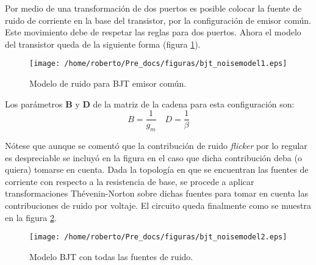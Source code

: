 \documentclass[letterpaper,10pt,twocolumn]{article}
\begin{document}
Por medio de una transformaci\'on de dos puertos es posible colocar la fuente de ruido de corriente en la base del transistor, por la configuraci\'on de emisor com\'un. Este movimiento debe de respetar las reglas para dos puertos. Ahora el modelo del transistor queda de la siguiente forma (figura \ref{fig:bjt_noise1}).
\begin{figure}
   \centering
   \texttt{[image: /home/roberto/Pre\_docs/figuras/bjt\_noisemodel1.eps]}
   \caption{Modelo de ruido para BJT emisor com\'un.}
   \label{fig:bjt_noise1}
\end{figure}
Los par\'ametros {\bf B} y {\bf D} de la matriz de la cadena para esta configuraci\'on son:
$$ B=\frac{1}{g_m}\quad D=\frac{1}{\beta}$$ 

N\'otese que aunque se coment\'o que la contribuci\'on de ruido {\it flicker} por lo regular es despreciable se incluy\'o en la figura en el caso que dicha contribuci\'on deba (o quiera) tomarse en cuenta. Dada la topolog\'ia en que se encuentran las fuentes de corriente con respecto a la resistencia de base, se procede a aplicar transformaciones Th\'evenin-Norton sobre dichas fuentes para tomar en cuenta las contribuciones de ruido por voltaje. El circuito queda finalmente como se muestra en la figura \ref{fig:bjt_noise2}.
\begin{figure}
   \centering
   \texttt{[image: /home/roberto/Pre\_docs/figuras/bjt\_noisemodel2.eps]}
   \caption{Modelo BJT con todas las fuentes de ruido.}
   \label{fig:bjt_noise2}
\end{figure}
\end{document}
